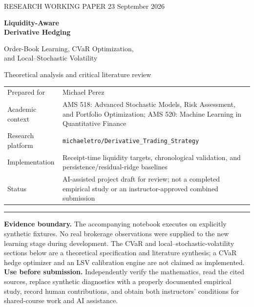 \documentclass[11pt,a4paper]{article}
\begin{document}
\begin{titlepage}
\thispagestyle{empty}
{\small RESEARCH WORKING PAPER \hfill 23 September 2026}\par
\vspace{22mm}
{\Huge\bfseries Liquidity-Aware\\[3mm] Derivative Hedging}\par
\vspace{8mm}
{\Large Order-Book Learning, CVaR Optimization,\\[2mm] and Local--Stochastic Volatility}\par
\vspace{9mm}
{\large Theoretical analysis and critical literature review}\par
\vspace{15mm}
\par\medskip
\begin{tabularx}{\textwidth}{@{}p{34mm}Y@{}}
Prepared for & Michael Perez\\
Academic context & AMS 518: Advanced Stochastic Models, Risk Assessment, and Portfolio Optimization; AMS 520: Machine Learning in Quantitative Finance\\
Research platform & \texttt{michaeletro/Derivative\_Trading\_Strategy}\\
Implementation & Receipt-time liquidity targets, chronological validation, and persistence/residual-ridge baselines\\
Status & AI-assisted project draft for review; not a completed empirical study or an instructor-approved combined submission
\end{tabularx}
\par\medskip
\vfill
\hrule\vspace{4mm}
\textbf{Evidence boundary.} The accompanying notebook executes on explicitly synthetic fixtures. No real brokerage observations were supplied to the new learning stage during development. The CVaR and local--stochastic-volatility sections below are a theoretical specification and literature synthesis; a CVaR hedge optimizer and an LSV calibration engine are not claimed as implemented.
\vspace{3mm}
\textbf{Use before submission.} Independently verify the mathematics, read the cited sources, replace synthetic diagnostics with a properly documented empirical study, record human contributions, and obtain both instructors' conditions for shared-course work and AI assistance.
\end{titlepage}
\end{document}
